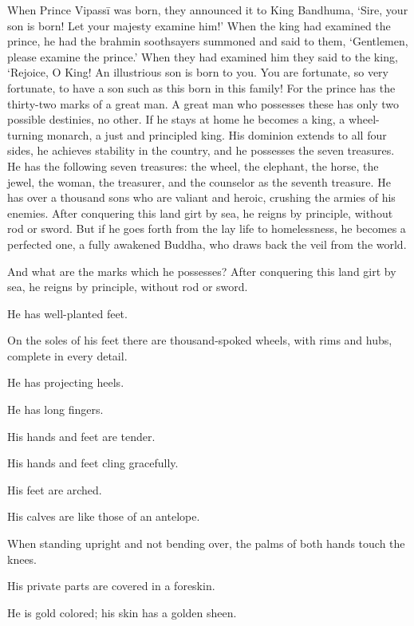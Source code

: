 \documentclass[12pt,openany]{book}%
\begin{document}
When Prince \textsanskrit{Vipassī} was born, they announced it to King Bandhuma, ‘Sire, your son is born! Let your majesty examine him!’ When the king had examined the prince, he had the brahmin soothsayers summoned and said to them, ‘Gentlemen, please examine the prince.’ When they had examined him they said to the king, ‘Rejoice, O King! An illustrious son is born to you. You are fortunate, so very fortunate, to have a son such as this born in this family! For the prince has the thirty-two marks of a great man. A great man who possesses these has only two possible destinies, no other. If he stays at home he becomes a king, a wheel-turning monarch, a just and principled king. His dominion extends to all four sides, he achieves stability in the country, and he possesses the seven treasures. He has the following seven treasures: the wheel, the elephant, the horse, the jewel, the woman, the treasurer, and the counselor as the seventh treasure. He has over a thousand sons who are valiant and heroic, crushing the armies of his enemies. After conquering this land girt by sea, he reigns by principle, without rod or sword. But if he goes forth from the lay life to homelessness, he becomes a perfected one, a fully awakened Buddha, who draws back the veil from the world. 

And what are the marks which he possesses? After conquering this land girt by sea, he reigns by principle, without rod or sword. 

He has well-planted feet. 

On the soles of his feet there are thousand-spoked wheels, with rims and hubs, complete in every detail. 

He has projecting heels. 

He has long fingers. 

His hands and feet are tender. 

His hands and feet cling gracefully. 

His feet are arched. 

His calves are like those of an antelope. 

When standing upright and not bending over, the palms of both hands touch the knees. 

His private parts are covered in a foreskin. 

He is gold colored; his skin has a golden sheen. 
\end{document}
